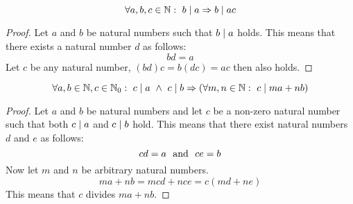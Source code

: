 \documentclass[main.tex]{subfiles}
\begin{document}
\begin{pr}
  \label{pr:divisor-also-divides-multiple}
  \[ \forall a, b, c \in \mathbb{N}:\ b \mid a \Rightarrow b \mid ac \]
  
  \begin{proof}
    Let $a$ and $b$ be natural numbers such that $b \mid a$ holds.
    This means that there exists a natural number $d$ as follows:
    \[ bd = a \]
    Let $c$ be any natural number, $(bd)c = b(dc) = ac$ then also holds.
  \end{proof}
\end{pr}

\begin{pr}
  \[ \forall a, b \in \mathbb{N}, c \in \mathbb{N}_{0}:\ c \mid a \ \wedge\  c \mid b \Rightarrow (\forall m, n \in \mathbb{N}:\ c \mid ma + nb) \]

  \begin{proof}
    Let $a$ and $b$ be natural numbers and let $c$ be a non-zero natural number such that both $c \mid a$ and $c \mid b$ hold.
    This means that there exist natural numbers $d$ and $e$ as follows:
    \[ cd = a \ \text{ and }\  ce = b \]
    Now let $m$ and $n$ be arbitrary natural numbers.
    \[ ma + nb = mcd + nce = c(md + ne) \]
    This means that $c$ divides $ma + nb$.
  \end{proof}
\end{pr}

\end{document}
